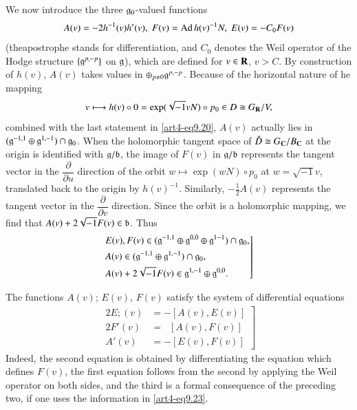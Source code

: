We now introduce the three $\mathfrak{g}_0$-valued functions 
\begin{equation}
A(v) = - 2h^{-1} (v) h' (v), \;F (v) = \operatorname{Ad} h (v)^{-1} N, \; E (v) = - C_0 F (v) 
\label{art4-eq9.22}
\end{equation}
(the\pageoriginale apostrophe stands for differentiation, and $C_0$ denotes the Weil operator of the Hodge structure $\{\mathfrak{g}^{p,-p}\}$ on $\mathfrak{g}$), which are defined for $v \in \mathbf{R}$, $v > C$. By construction of $h(v)$, $A(v)$ takes values in $\oplus_{p \neq 0} \mathfrak{g}^{p, -p}$. Because of the horizontal nature of he mapping
$$
v \longmapsto h (v) \circ 0 = \exp (\sqrt{-1} v N) \circ p_0 \in D \cong G_{\mathbf{R}} / V,
$$
combined with the last statement in \eqref{art4-eq9.20}, $A(v)$ actually lies in $(\mathfrak{g}^{-1,1} \oplus \mathfrak{g}^{1, -1}) \cap \mathfrak{g}_0$. When the holomorphic tangent space of $\check{D} \cong G_{\mathbf{C}} / B_{\mathbf{C}}$ at the origin is identified with $\mathfrak{g}/\mathfrak{b}$, the image of $F (v)$ in $\mathfrak{g}/\mathfrak{b}$ represents the tangent vector in the $\dfrac{\partial}{\partial u}$ direction of the orbit $w \longmapsto \exp (w N) \circ p_0$ at $w = \sqrt{-1} v$, translated back to the origin by $h(v)^{-1}$. Similarly, $-\frac{1}{2} A(v)$ represents the tangent vector in the $\dfrac{\partial}{\partial v}$ direction. Since the orbit is a holomorphic mapping, we find that $A (v) + 2 \sqrt{-1} F (v) \in \mathfrak{b}$. Thus
\begin{equation}
\left.
\begin{aligned}
& E (v), F(v) \in (\mathfrak{g}^{-1,1} \oplus \mathfrak{g}^{0,0} \oplus \mathfrak{g}^{1-1}) \cap \mathfrak{g}_0,\\
& A(v) \in (\mathfrak{g}^{-1,1} \oplus \mathfrak{g}^{1,-1}) \cap \mathfrak{g}_0,\\
& A (v) +2 \sqrt{-1} F (v) \in \mathfrak{g}^{1,-1} \oplus \mathfrak{g}^{0,0}.
\end{aligned}
 \right] \label{art4-eq9.23}
\end{equation}

The functions $A(v)$; $E(v)$, $F(v)$ satisfy the system of differential equations
\begin{align}
\left.
\begin{aligned}
2 E; (v) & = - [A(v), E (v)]\\
2 F' (v) & = \;\; [A (v), F (v)]\\
A' (v) & = -[E(v), F (v)] 
\end{aligned}
\right] \label{art4-eq9.24}
\end{align}
Indeed, the second equation is obtained by differentiating the equation which defines $F (v)$, the first equation follows from the second by applying the Weil operator on both sides, and the third is a formal consequence of the preceding two, if one uses the information in \eqref{art4-eq9.23}.

